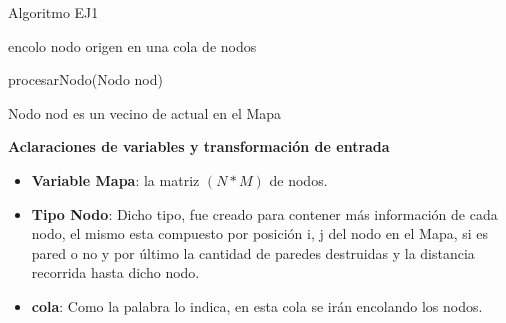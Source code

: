 \begin{algorithm}[H] %
 \caption{Algoritmo EJ1}
	encolo nodo origen en una cola de nodos \\
	    
\end{algorithm}


\begin{algorithm}[H] %
 \caption{procesarNodo(Nodo nod)}
 	Nodo nod es un vecino de actual en el Mapa\\
	
			
			
\end{algorithm}


\textbf{Aclaraciones de variables y transformaci\'on de entrada}

\begin{itemize}
\item {\bf Variable Mapa}: la matriz $(N \ast M)$ de nodos.
\item {\bf Tipo Nodo}: Dicho tipo, fue creado para contener m\'as informaci\'on de cada nodo, el mismo esta compuesto por posici\'on i, j del nodo en el Mapa, si es pared o no y por \'ultimo la cantidad de paredes destruidas y la distancia recorrida hasta dicho nodo.
\item {\bf cola}: Como la palabra lo indica, en esta cola se ir\'an encolando los nodos.
\end{itemize}  



